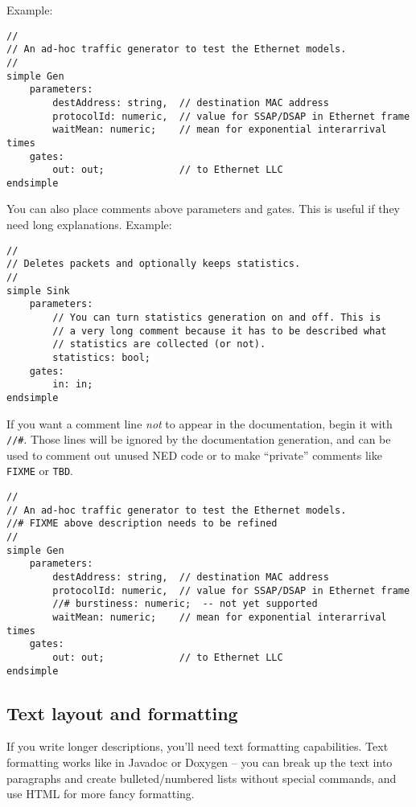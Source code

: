 Example:

\begin{verbatim}
//
// An ad-hoc traffic generator to test the Ethernet models.
//
simple Gen
    parameters:
        destAddress: string,  // destination MAC address
        protocolId: numeric,  // value for SSAP/DSAP in Ethernet frame
        waitMean: numeric;    // mean for exponential interarrival times
    gates:
        out: out;             // to Ethernet LLC
endsimple
\end{verbatim}

You can also place comments above parameters and gates. This is useful
if they need long explanations. Example:

\begin{verbatim}
//
// Deletes packets and optionally keeps statistics.
//
simple Sink
    parameters:
        // You can turn statistics generation on and off. This is
        // a very long comment because it has to be described what
        // statistics are collected (or not).
        statistics: bool;
    gates:
        in: in;
endsimple
\end{verbatim}

If you want a comment line \textit{not} to appear in the documentation,
begin it with \texttt{//\#}. Those lines will be ignored by the
documentation generation, and can be used to comment out
unused NED code or to make ``private'' comments like \texttt{FIXME} or
\texttt{TBD}.

\begin{verbatim}
//
// An ad-hoc traffic generator to test the Ethernet models.
//# FIXME above description needs to be refined
//
simple Gen
    parameters:
        destAddress: string,  // destination MAC address
        protocolId: numeric,  // value for SSAP/DSAP in Ethernet frame
        //# burstiness: numeric;  -- not yet supported
        waitMean: numeric;    // mean for exponential interarrival times
    gates:
        out: out;             // to Ethernet LLC
endsimple
\end{verbatim}


\subsection{Text layout and formatting}

If you write longer descriptions, you'll need text formatting capabilities.
Text formatting works like in Javadoc or Doxygen -- you can break up the
text into paragraphs and create bulleted/numbered lists without
special commands, and use HTML for more fancy formatting.

